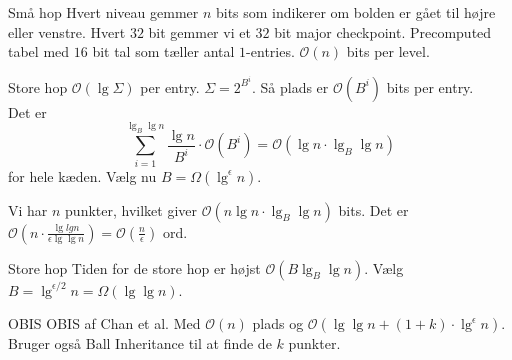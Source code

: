 \documentclass[pdf]{beamer}
\begin{document}
\begin{frame}{Små hop}
  Hvert niveau gemmer $n$ bits som indikerer om bolden er gået til højre eller venstre. Hvert $32$ bit gemmer vi et $32$ bit major checkpoint. Precomputed tabel med $16$ bit tal som tæller antal $1$-entries. $\mathcal{O}(n)$ bits per level.
\end{frame}

\begin{frame}{Store hop}
  $\mathcal{O}(\lg \Sigma)$ per entry. $\Sigma = 2^{B^i}$. Så plads er $\mathcal{O}(B^i)$ bits per entry.\\

  Det er $$\sum_{i=1}^{\lg_B \lg n} \frac{\lg n}{B^i}\cdot\mathcal{O}(B^i) = \mathcal{O}(\lg n \cdot \lg_B \lg n)$$ for hele kæden. Vælg nu $B = \Omega(\lg^\epsilon n)$.


  Vi har $n$ punkter, hvilket giver $\mathcal{O}(n\lg n \cdot\lg_B \lg n)$ bits. Det er $\mathcal{O}(n\cdot\frac{\lg lg n}{\epsilon \lg \lg n}) = \mathcal{O}(\frac{n}{\epsilon})$ ord.
\end{frame}

\begin{frame}{Store hop}
  Tiden for de store hop er højst $\mathcal{O}(B \lg_B \lg n)$. Vælg $B = \lg^{\epsilon / 2} n = \Omega(\lg \lg n)$.
\end{frame}


\begin{frame}{OBIS}
  OBIS af Chan et al. Med $\mathcal{O}(n)$ plads og $\mathcal{O}(\lg \lg n + (1+k)\cdot\lg^\epsilon n)$. Bruger også Ball Inheritance til at finde de $k$ punkter.
\end{frame}
\end{document}

